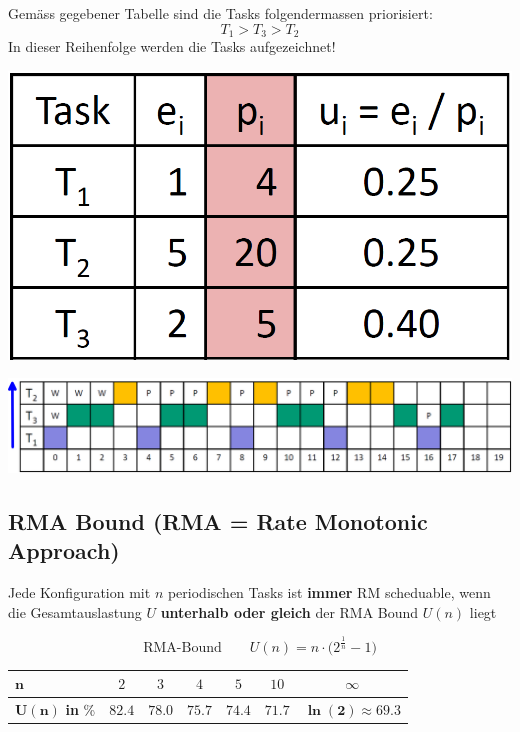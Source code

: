 
\begin{minipage}[t]{0.55\columnwidth}
    Gemäss gegebener Tabelle sind die Tasks folgendermassen priorisiert:
    $$ T_1 > T_3 > T_2 $$
    In dieser Reihenfolge werden die Tasks aufgezeichnet!
\end{minipage}
\hfill
\begin{minipage}[t]{0.38\columnwidth}
    \includegraphics[width=\columnwidth, align=t]{images/scheduling_RMS_example_tabelle.png}
\end{minipage}

\begin{center}
    \includegraphics[width=\columnwidth]{images/scheduling_RMS_example_schedule.png}
\end{center}


\subsection{RMA Bound (RMA = Rate Monotonic Approach)}

Jede Konfiguration mit $n$ periodischen Tasks ist \textbf{immer} RM scheduable, wenn die Gesamtauslastung $U$ 
\textbf{unterhalb oder gleich} der RMA Bound $U(n)$ liegt

$$ \text{RMA-Bound} \qquad U(n) = n \cdot \big( 2^{\frac{1}{n}} - 1 \big)  $$

\begin{center}
    \begin{tabular}{l cccccc}
        \toprule
        $\bm{n}$                    & $2$       & $3$       & $4$       & $5$       & $10$      & $\infty$                      \\
        \midrule
        $\bm{U(n)}$ \textbf{in} \%  & $82.4$    & $78.0$    & $75.7$    & $74.4$    & $71.7$    & $\bm{\ln(2) \approx 69.3}$    \\
        \bottomrule
    \end{tabular}
\end{center}

